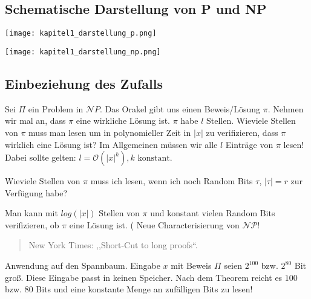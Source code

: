 \subsection*{Schematische Darstellung von P und NP}
\begin{center}
	\texttt{[image: kapitel1\_darstellung\_p.png]}
	\label{fig:p}
\end{center}

\begin{center}
	\texttt{[image: kapitel1\_darstellung\_np.png]}
	\label{fig:np}
\end{center}
\subsection*{Einbeziehung des Zufalls}
Sei $\Pi$ ein Problem in $\mathcal NP$. Das Orakel gibt uns einen Beweis/Lösung $\pi$. Nehmen wir mal an, dass $\pi$ eine %
wirkliche Lösung ist. $\pi$ habe $l$ Stellen. Wieviele Stellen von $\pi$ muss man lesen um in polynomieller Zeit in %
$\lvert x \rvert$ zu verifizieren, dass $\pi$ wirklich eine Lösung ist?
Im Allgemeinen müssen wir alle $l$ Einträge von $\pi$ lesen! Dabei sollte gelten: $l=\mathcal O(\lvert x \rvert^k), k \text{ konstant}$.

Wieviele Stellen von $\pi$ muss ich lesen, wenn ich noch Random Bits $\tau$, $\lvert \tau \rvert = r$ zur Verfügung habe?
\begin{theorem}
Man kann mit $log(\lvert x \rvert)$ Stellen von $\pi$ und konstant vielen Random Bits verifizieren, ob $\pi$ eine Lösung ist.
( Neue Characterisierung von $\mathcal{NP}$!
\end{theorem}
\begin{quotation}
New York Times: ,,Short-Cut to long proofs``.
\end{quotation}
Anwendung auf den Spannbaum.
Eingabe $x$ mit Beweis $\Pi$ seien $2^100$ bzw. $2^80$ Bit groß. Diese Eingabe passt in keinen Speicher.
Nach dem Theorem reicht es $100$ bzw. $80$ Bits und eine konstante Menge an zufälligen Bits zu lesen!



